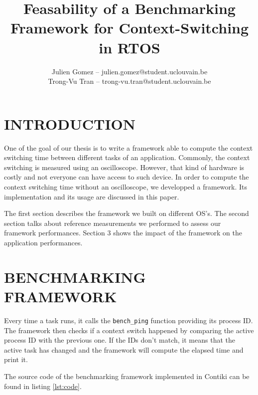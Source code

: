 \documentclass[a4paper, 10pt, conference]{ieeeconf}      %
\title{\LARGE \bf
Feasability of a Benchmarking Framework for Context-Switching in RTOS
}
\author{Julien Gomez -- julien.gomez@student.uclouvain.be
\\ Trong-Vu Tran -- trong-vu.tran@student.uclouvain.be}
\begin{document}
\maketitle
\thispagestyle{empty}
\pagestyle{empty}




\section{INTRODUCTION}
One of the goal of our thesis is to write a framework able to compute the context switching time between different tasks of an application.
Commonly, the context switching is measured using an oscilloscope.
However, that kind of hardware is costly and not everyone can have access to such device.
In order to compute the context switching time without an oscilloscope, we developped a framework.
Its implementation and its usage are discussed in this paper.

The first section describes the framework we built on different OS's.
The second section talks about reference measurements we performed to assess our framework performances.
Section 3 shows the impact of the framework on the application performances.


\section{\label{sec:bench}BENCHMARKING FRAMEWORK}

Every time a task runs, it calls the \texttt{bench\_ping} function providing its process ID.
The framework then checks if a context switch happened by comparing the active process ID with the previous one.
If the IDs don't match, it means that the active task has changed and the framework will compute the elapsed time and print it.

The source code of the benchmarking framework implemented in Contiki can be found in listing \ref{lst:code}.
\end{document}

